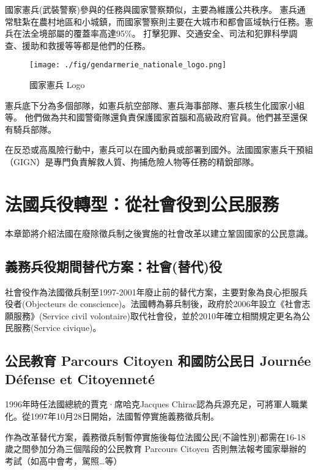 \documentclass[a4paper,14pt]{extarticle}
\theoremstyle{plain}
\theoremstyle{remark}
\numberwithin{equation}{section}
\begin{document}
國家憲兵(武裝警察)參與的任務與國家警察類似，主要為維護公共秩序。
憲兵通常駐紮在農村地區和小城鎮，而國家警察則主要在大城市和都會區域執行任務。憲兵在法全境部屬的覆蓋率高達95\%。
打擊犯罪、交通安全、司法和犯罪科學調查、援助和救援等等都是他們的任務。

\begin{wrapfigure}[8]{l}{5cm}
  \texttt{[image: ./fig/gendarmerie\_nationale\_logo.png]}
  \caption{國家憲兵 Logo}
\end{wrapfigure}

憲兵底下分為多個部隊，如憲兵航空部隊、憲兵海事部隊、憲兵核生化國家小組等。
他們做為共和國警衛隊還負責保護國家首腦和高級政府官員。他們甚至還保有騎兵部隊。



在反恐或高風險行動中，憲兵可以在國內動員或部署到國外。法國國家憲兵干預組（GIGN）是專門負責解救人質、拘捕危險人物等任務的精銳部隊。


\newpage 

\section{法國兵役轉型：從社會役到公民服務}


本章節將介紹法國在廢除徵兵制之後實施的社會改革以建立鞏固國家的公民意識。

\subsection{義務兵役期間替代方案：社會(替代)役}

社會役作為法國徵兵制至1997-2001年廢止前的替代方案，主要對象為良心拒服兵役者(Objecteurs de conscience)。法國轉為募兵制後，政府於2006年設立《社會志願服務》(Service civil volontaire)取代社會役\cite{loi_service_civil_volontaire}，並於2010年確立相關規定更名為公民服務(Service civique)\cite{loi_service_civique}。

\subsection{公民教育 Parcours Citoyen 和國防公民日 Journée Défense et Citoyenneté}

1996年時任法國總統的賈克·席哈克Jacques Chirac認為兵源充足，可將軍人職業化。從1997年10月28日開始，法國暫停實施義務徵兵制。

作為改革替代方案，義務徵兵制暫停實施後每位法國公民(不論性別)都需在16-18歲之間參加分為三個階段的公民教育 Parcours Citoyen 否則無法報考國家舉辦的考試（如高中會考，駕照…等）
\end{document}
